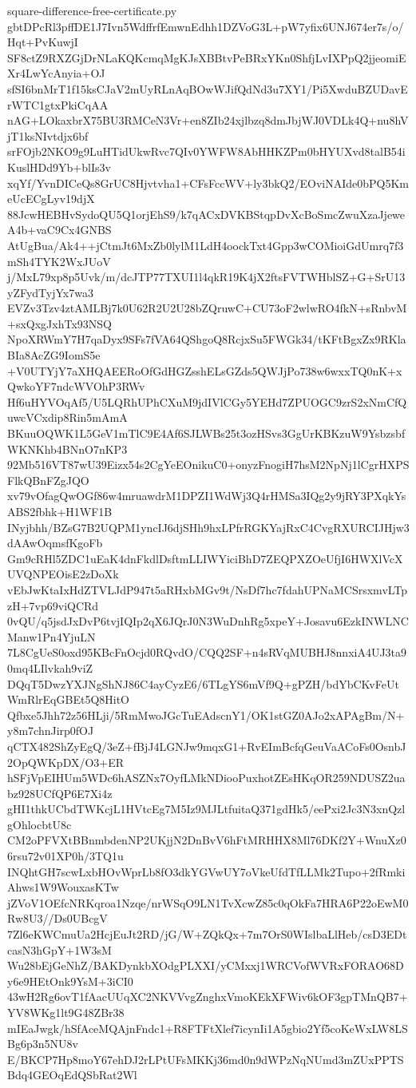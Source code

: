 \documentclass[11pt]{article}
\theoremstyle{definition}
\theoremstyle{remark}
\begin{document}
\begin{filecontents*}[overwrite]{square-difference-free-certificate.py}
gbtDPcRl3pffDE1J7Ivn5WdffrfEmwnEdhh1DZVoG3L+pW7yfix6UNJ674er7s/o/Hqt+PvKuwjI
SF8ctZ9RXZGjDrNLaKQKcmqMgKJsXBBtvPeBRxYKn0ShfjLvIXPpQ2jjeomiEXr4LwYcAnyia+OJ
sfSI6bnMrT1f15ksCJaV2mUyRLnAqBOwWJifQdNd3u7XY1/Pi5XwduBZUDavErWTC1gtxPkiCqAA
nAG+LOkaxbrX75BU3RMCeN3Vr+en8ZIb24xjlbzq8dmJbjWJ0VDLk4Q+nu8hVjT1ksNIvtdjx6bf
srFOjb2NKO9g9LuHTidUkwRvc7QIv0YWFW8AbHHKZPm0bHYUXvd8talB54iKuslHDd9Yb+blIs3v
xqYf/YvnDICeQs8GrUC8Hjvtvha1+CFsFccWV+ly3bkQ2/EOviNAIde0bPQ5KmeUcECgLyv19djX
88JcwHEBHvSydoQU5Q1orjEhS9/k7qACxDVKBStqpDvXcBoSmcZwuXzaJjeweA4b+vaC9Cx4GNBS
AtUgBua/Ak4++jCtmJt6MxZb0lylM1LdH4oockTxt4Gpp3wCOMioiGdUmrq7f3mSh4TYK2WxJUoV
j/MxL79xp8p5Uvk/m/dcJTP77TXUI1l4qkR19K4jX2ftsFVTWHblSZ+G+SrU13yZFydTyjYx7wa3
EVZv3Tzv4ztAMLBj7k0U62R2U2U28bZQruwC+CU73oF2wlwRO4fkN+sRnbvM+sxQxgJxhTx93NSQ
NpoXRWmY7H7qaDyx9SFs7fVA64QShgoQ8RcjxSu5FWGk34/tKFtBgxZx9RKlaBIa8AcZG9IomS5e
+V0UTYjY7aXHQAEERoOfGdHGZsshELsGZds5QWJjPo738w6wxxTQ0nK+xQwkoYF7ndcWVOhP3RWv
Hf6uHYVOqAf5/U5LQRhUPhCXuM9jdIVlCGy5YEHd7ZPUOGC9zrS2xNmCfQuwcVCxdip8Rin5mAmA
BKuuOQWK1L5GeV1mTlC9E4Af6SJLWBs25t3ozHSvs3GgUrKBKzuW9YsbzsbfWKNKhb4BNnO7nKP3
92Mb516VT87wU39Eizx54s2CgYeEOnikuC0+onyzFnogiH7hsM2NpNj1lCgrHXPSFlkQBnFZgJQO
xv79vOfagQwOGf86w4mruawdrM1DPZI1WdWj3Q4rHMSa3IQg2y9jRY3PXqkYsABS2fbhk+H1WF1B
INyjbhh/BZsG7B2UQPM1yncIJ6djSHh9hxLPfrRGKYajRxC4CvgRXURCIJHjw3dAAwOqmsfKgoFb
Gm9cRHl5ZDC1uEaK4dnFkdlDsftmLLIWYiciBhD7ZEQPXZOeUfjI6HWXlVcXUVQNPEOisE2zDoXk
vEbJwKtaIxHdZTVLJdP947t5aRHxbMGv9t/NsDf7hc7fdahUPNaMCSrsxmvLTpzH+7vp69viQCRd
0vQU/q5jsdJxDvP6tvjIQIp2qX6JQrJ0N3WuDnhRg5xpeY+Josavu6EzkINWLNCManw1Pn4YjuLN
7L8CgUeS0oxd95KBcFnOcjd0RQvdO/CQQ2SF+n4sRVqMUBHJ8nnxiA4UJ3ta90mq4LIlvkah9viZ
DQqT5DwzYXJNgShNJ86C4ayCyzE6/6TLgYS6mVf9Q+gPZH/bdYbCKvFeUtWmRlrEqGBEt5Q8HitO
Qfbxe5Jhh72z56HLji/5RmMwoJGcTuEAdscnY1/OK1stGZ0AJo2xAPAgBm/N+y8m7chnJirp0fOJ
qCTX482ShZyEgQ/3eZ+fBjJ4LGNJw9mqxG1+RvEImBcfqGeuVaACoFs0OsnbJ2OpQWKpDX/O3+ER
hSFjVpEIHUm5WDc6hASZNx7OyfLMkNDiooPuxhotZEsHKqOR259NDUSZ2uabz928UCfQP6E7Xi4z
gHI1thkUCbdTWKcjL1HVtcEg7M5Iz9MJLtfuitaQ371gdHk5/eePxi2Jc3N3xnQzlgOhlocbtU8c
CM2oPFVXtBBnmbdenNP2UKjjN2DnBvV6hFtMRHHX8Ml76DKf2Y+WnuXz06rsu72v01XP0h/3TQ1u
INQhtGH7scwLxbHOvWprLb8fO3dkYGVwUY7oVkeUfdTfLLMk2Tupo+2fRmkiAhws1W9WouxasKTw
jZVoV1OEfcNRKqroa1Nzqe/nrWSqO9LN1TvXcwZ85c0qOkFa7HRA6P22oEwM0Rw8U3//Ds0UBcgV
7Zl6eKWCmuUa2HcjEuJt2RD/jG/W+ZQkQx+7m7OrS0WIslbaLlHeb/csD3EDtcasN3hGpY+1W3sM
Wu28bEjGeNhZ/BAKDynkbXOdgPLXXI/yCMxxj1WRCVofWVRxFORAO68Dy6e9HEtOnk9YsM+3iCI0
43wH2Rg6ovT1fAacUUqXC2NKVVvgZnghxVmoKEkXFWiv6kOF3gpTMnQB7+YV8WKg1lt9G48ZBr38
mIEaJwgk/hSfAceMQAjnFndc1+R8FTFtXlef7icynIi1A5gbio2Yf5coKeWxLW8LSBg6p3n5NU8v
E/BKCP7Hp8moY67ehDJ2rLPtUFsMKKj36md0n9dWPzNqNUmd3mZUxPPTSBdq4GEOqEdQSbRat2Wl

\end{filecontents*}
\end{document}
